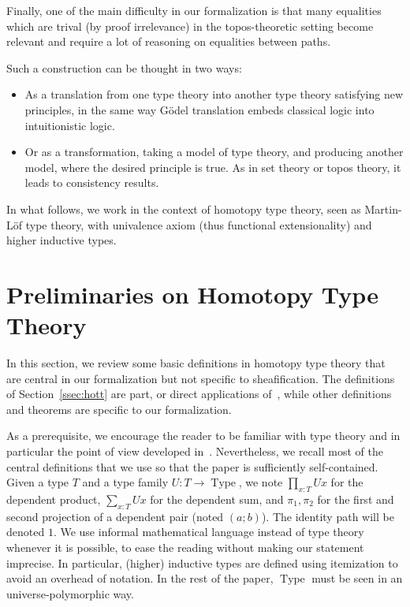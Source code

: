 \documentclass[preprint,9pt,numbers]{sigplanconf}
\DeclareMathOperator{\Type}{Type}
\begin{document}
Finally, one of the main difficulty in our formalization is that many
equalities which are trival (by proof irrelevance) in the topos-theoretic
setting become relevant and require a lot of reasoning on equalities
between paths.

Such a construction can be thought in two ways:
\begin{itemize}
\item As a translation from one type theory into another type theory
  satisfying new principles, in the same way Gödel translation embeds
  classical logic into  intuitionistic logic.
\item Or as a transformation, taking a model of type theory, and
  producing another model, where the desired principle is true. As in
  set theory or topos theory, it leads to consistency results.
\end{itemize}

In what follows, we work in the context of homotopy type theory, seen
as Martin-Löf type theory, with univalence axiom (thus functional
extensionality) and higher inductive types.


 
\section{Preliminaries on Homotopy Type Theory}
\label{sec:hott}

In this section, we review some basic definitions in homotopy type
theory that are central in our formalization but not specific to
sheafification. 
The definitions of Section~\ref{ssec:hott} 
are part, or direct applications of~\cite{hottbook}, while other definitions
and theorems are specific to our formalization. 

As a prerequisite, we encourage the reader to be familiar with type theory and
in particular the point of view developed
in~\cite{hottbook}. Nevertheless, we recall most of the central definitions 
that we use so that the paper is sufficiently self-contained.
%
Given a type $T$ and a type family $U : T \to \Type$, we note
$\prod_{x:T} U x$ for the dependent product, $\sum_{x:T} U x$ for the dependent
sum, and $\pi_1, \pi_2$ for the first and second projection of a
dependent pair (noted $(a;b)$). The identity path will be denoted
$1$. We use informal mathematical language
instead of type theory whenever it is possible, to ease the reading
without making our statement imprecise. In particular, (higher)
inductive types are defined using itemization to avoid an overhead of
notation. In the rest of the paper, $\Type$ must be seen in an
universe-polymorphic way.
\end{document}

